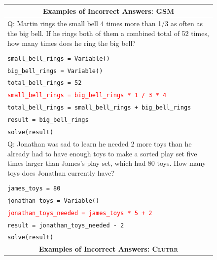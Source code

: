 \documentclass{article}
\theoremstyle{definition}
\newcommand{\gsm}{\textsc{GSM}}
\newcommand{\clutrr}{\textsc{Clutrr}}
\begin{document}
\begin{figure}[h]
    \footnotesize
    \centering
    \begin{tabularx}{\linewidth}{X}
    \toprule
        \multicolumn{1}{c}{\bf Examples of Incorrect Answers: \gsm{}} \\
         \midrule
         Q: Martin rings the small bell 4 times more than 1/3 as often as the big bell. If he rings both of them a combined total of 52 times, how many times does he ring the big bell? \\
\\
  \tt  small\_bell\_rings = Variable() \\
   \tt big\_bell\_rings = Variable() \\
   \tt total\_bell\_rings = 52 \\
   \tt \textcolor{red}{small\_bell\_rings = big\_bell\_rings * 1 / 3 * 4 }\\
   \tt total\_bell\_rings = small\_bell\_rings + big\_bell\_rings \\
    \tt result = big\_bell\_rings \\
    \tt solve(result) \\
    \midrule
        Q: Jonathan was sad to learn he needed 2 more toys than he already had to have enough toys to make a sorted play set five times larger than James's play set, which had 80 toys. How many toys does Jonathan currently have? \\
        \\
  \tt  james\_toys = 80 \\
   \tt jonathan\_toys = Variable() \\
  \tt  \textcolor{red}{jonathan\_toys\_needed = james\_toys * 5 + 2} \\
   \tt result = jonathan\_toys\_needed - 2 \\
  \tt  solve(result) \\
    \midrule
     \multicolumn{1}{c}{\bf Examples of Incorrect Answers: \clutrr{}} \\
    \midrule


\end{tabularx}
\end{figure}
\end{document}
